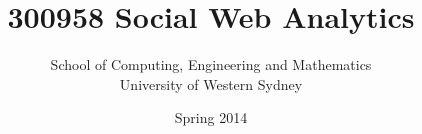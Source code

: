 \title{300958 Social Web Analytics}
\author{School of Computing, Engineering and Mathematics\\University of Western Sydney}
\date{Spring 2014}




\renewcommand{\subsubsection}[1]{\paragraph{#1}}

\usepackage{fancyvrb}
\usepackage{xspace}
\usepackage{fullwidth}


\newcommand{\openepigraph}[2]{%
  \begin{fullwidth}
  \sffamily\large
  \begin{doublespace}
  \noindent\allcaps{#1}\\%
  \noindent\allcaps{#2}%
  \end{doublespace}
  \end{fullwidth}
}

\newcommand{\blankpage}{\newpage\hbox{}\thispagestyle{empty}\newpage}

\newcommand{\monthyear}{%
  \ifcase\month\or January\or February\or March\or April\or May\or June\or
  July\or August\or September\or October\or November\or
  December\fi\space\number\year
}

\usepackage{units}




\frontmatter

\thispagestyle{empty}
\maketitle



